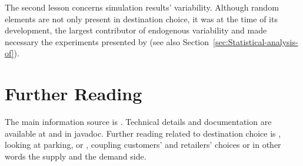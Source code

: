 The second lesson concerns simulation results' variability. 
Although random elements are not only present in destination choice, it was at the time of its development, the largest contributor of endogenous variability and made necessary the experiments presented by \citet[][]{HorniEtAl_TechRep_IVT_2011_b} (see also Section~\ref{sec:Statistical-analysis-of}).

\section{Further Reading}
The main information source is \citet[][]{HorniEtAl_unpub_TRB_2012, Horni_PhDThesis_2013}. 
Technical details and documentation are available at \citet[][]{MATSIM-T-DC_Webpage_2015} and in \gls{javadoc}. 
Further reading related to destination choice is \citet[][]{HorniEtAl_IATBRspec_2013}, looking at parking, or \citet[][]{HorniEtAl_TechRep_IVT_2012}, coupling customers' and retailers' choices or in other words the supply and the demand side.


